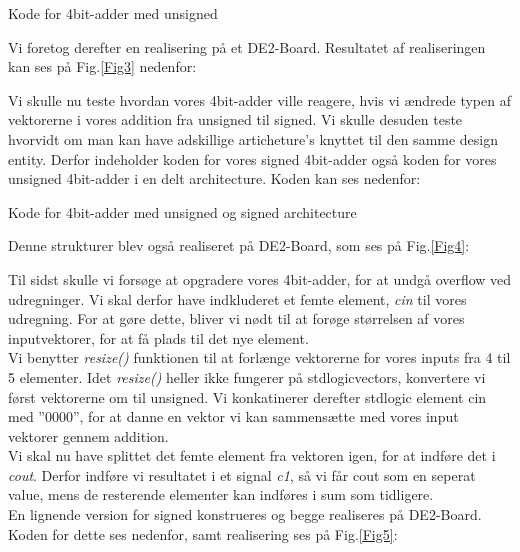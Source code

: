 \documentclass[../journal2.tex]{subfiles}
\begin{document}
\begin{table}[H]
    \centering
      \framebox{
        \rule{8pt}{0pt}
          
  }
  \caption{Kode for 4bit-adder med unsigned}	
  \label{src:Tab1}
\end{table}

Vi foretog derefter en realisering på et DE2-Board. Resultatet af realiseringen kan ses på Fig.\ref{Fig3} nedenfor:


Vi skulle nu teste hvordan vores 4bit-adder ville reagere, hvis vi ændrede typen af vektorerne i vores addition fra unsigned til signed. Vi skulle desuden teste hvorvidt om man kan have adskillige articheture's knyttet til den samme design entity. Derfor indeholder koden for vores signed 4bit-adder også koden for vores unsigned 4bit-adder i en delt architecture. Koden kan ses nedenfor:

\begin{table}[H]
    \centering
      \framebox{
        \rule{8pt}{0pt}
          
  }
  \caption{Kode for 4bit-adder med unsigned og signed architecture}	
  \label{src:Tab2}
\end{table}

Denne strukturer blev også realiseret på DE2-Board, som ses på Fig.\ref{Fig4}:


Til sidst skulle vi forsøge at opgradere vores 4bit-adder, for at undgå overflow ved udregninger. Vi skal derfor have indkluderet et femte element, \textit{c\textunderscore in} til vores udregning. For at gøre dette, bliver vi nødt til at forøge størrelsen af vores inputvektorer, for at få plads til det nye element.\\
Vi benytter \textit{resize()} funktionen til at forlænge vektorerne for vores inputs fra 4 til 5 elementer. Idet \textit{resize()} heller ikke fungerer på std\textunderscore logic\textunderscore vectors, konvertere vi først vektorerne om til unsigned. Vi konkatinerer derefter std\textunderscore logic element c\textunderscore in med ''0000'', for at danne en vektor vi kan sammensætte med vores input vektorer gennem addition.\\
Vi skal nu have splittet det femte element fra vektoren igen, for at indføre det i \textit{c\textunderscore out}. Derfor indføre vi resultatet i et signal \textit{c1}, så vi får c\textunderscore out som en seperat value, mens de resterende elementer kan indføres i sum som tidligere.\\
En lignende version for signed konstrueres og begge realiseres på DE2-Board.  Koden for dette ses nedenfor, samt realisering ses på Fig.\ref{Fig5}:
\end{document}
